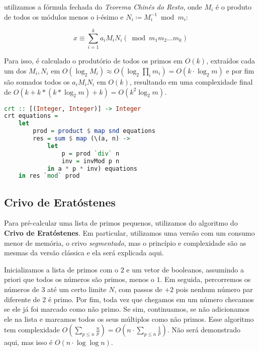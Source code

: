 \documentclass{article}
\begin{document}
utilizamos a fórmula fechada do \textit{Teorema Chinês do Resto}, onde $M_i$ é o produto de todos os módulos menos o i-ésimo e $N_i \coloneq M_i^{-1} \bmod m_i$:

\[
  x \equiv \sum_{i=1}^{k} a_iM_iN_i (\bmod m_1m_2 \ldots m_k)
\]

Para isso, é calculado o produtório de todos os primos em $O(k)$, extraídos cada um dos $M_i, N_i$ em $O(\log_2 M_i) \approx O(\log_2 \prod_i m_i) = O(k \cdot \log_2 m)$ e por fim são somados todos os $a_iM_iN_i$ em $O(k)$, resultando em uma complexidade final de $O(k + k*(k* \log_2 m) + k) = O(k^2 \log_2 m)$.

\begin{minipage}{.9\linewidth}
\begin{lstlisting}[language=haskell,caption=Teorema Chinês do Resto]
crt :: [(Integer, Integer)] -> Integer
crt equations =
    let
        prod = product $ map snd equations
        res = sum $ map (\(a, n) ->
            let
                p = prod `div` n
                inv = invMod p n
            in a * p * inv) equations
    in res `mod` prod
\end{lstlisting}
\end{minipage}

\subsection{Crivo de Eratóstenes}

Para pré-calcular uma lista de primos pequenos, utilizamos do algoritmo do \textbf{Crivo de Eratóstenes}. Em particular, utilizamos uma versão com um consumo menor de memória, o crivo \textit{segmentado}, mas o princípio e complexidade são as mesmas da versão clássica e ela será explicada aqui.

Inicializamos a lista de primos com o $2$ e um vetor de booleanos, assumindo a priori que todos os números são primos, menos o $1$. Em seguida, percorremos os números de $3$ até um certo limite $N$, com passos de $+2$ pois nenhum número par diferente de 2 é primo. Por fim, toda vez que chegamos em um número checamos se ele já foi marcado como não primo. Se sim, continuamos, se não adicionamos ele na lista e marcamos todos os seus múltiplos como não primos. Esse algoritmo tem complexidade $O(\sum_{p \leq n} \frac{n}{p}) = O(n \cdot \sum_{p \leq n}\frac{1}{p})$. Não será demonstrado aqui, mas isso é $O(n \cdot \log \log n)$.
\end{document}
